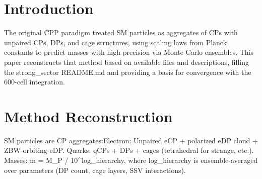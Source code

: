 \documentclass{article}
\begin{document}
\maketitle\begin{abstract}
This paper reconstructs the original Conscious Point Physics (CPP) method for calculating Standard Model (SM) particle masses\ agreement with experimental values using shared-parameter ensemble Monte-Carlo simulations. Masses emerge from scaling the Planck mass with logarithmic hierarchies derived from CP/DP (Conscious Point/Dipole Point) aggregates and cage interactions. We document the method, provide example code for proton mass calculation, and discuss integration with the 600-cell lattice model. This serves as a bridge to extend the successful approach to the current framework.
\end{abstract}\section{Introduction}The original CPP paradigm treated SM particles as aggregates of CPs with unpaired CPs, DPs, and cage structures, using scaling laws from Planck constants to predict masses with high precision via Monte-Carlo ensembles. This paper reconstructs that method based on available files and descriptions, filling the strong\_sector README.md and providing a basis for convergence with the 600-cell integration.\section{Method Reconstruction}SM particles are CP aggregates:Electron: Unpaired eCP + polarized eDP cloud + ZBW-orbiting eDP.
Quarks: qCPs + DPs + cages (tetrahedral for strange, etc.).
Masses: m = M_P / 10^{log_hierarchy}, where log_hierarchy is ensemble-averaged over parameters (DP count, cage layers, SSV interactions).
\end{document}
